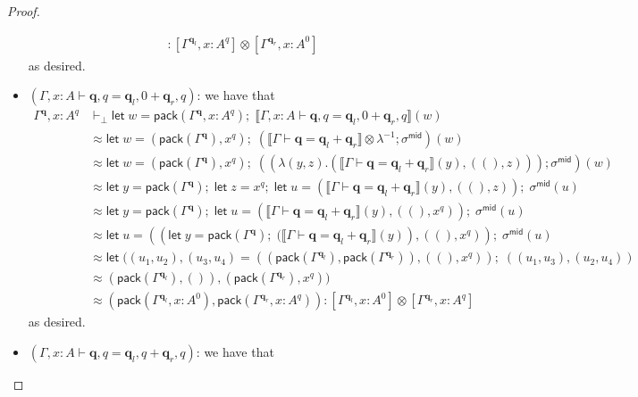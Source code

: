 \documentclass[acmsmall,screen,review]{acmart}
\newcommand{\mb}[1]{\ensuremath{\mathbf{#1}}}
\newcommand{\ms}[1]{\ensuremath{\mathsf{#1}}}
\newcommand{\letexpr}[3]{\ensuremath{\ms{let}\;#1 = #2;\;#3}}
\newcommand{\qsp}[4]{#1 \vdash #2 = #3 + #4}
\newcommand{\dnt}[1]{\llbracket{#1}\rrbracket}
\begin{document}
\begin{proof}
\begin{itemize}
\begin{align*}
        : [\Gamma^{\mb{q}_l}, x : A^q] \otimes [\Gamma^{\mb{q}_r}, x : A^0]
    \end{align*}
    as desired.
    \item $(\qsp{\Gamma, x : A}{\mb{q}, q}{\mb{q}_l, 0}{\mb{q}_r, q})$: we have that
    \begin{align*}
      \Gamma^{\mb{q}}, x : A^q &\vdash_\bot
        \letexpr{w}{\ms{pack}(\Gamma^{\mb{q}}, x : A^q)}
          {\dnt{\qsp{\Gamma, x : A}{\mb{q}, q}{\mb{q}_l, 0}{\mb{q}_r, q}}(w)} \\
        &\approx
        \letexpr{w}{(\ms{pack}(\Gamma^{\mb{q}}), x^q)}{
          (\dnt{\qsp{\Gamma}{\mb{q}}{\mb{q}_l}{\mb{q}_r}} \otimes \lambda^{-1} 
            ; \sigma^{\ms{mid}})(w)
        } \\
        &\approx
        \letexpr{w}{(\ms{pack}(\Gamma^{\mb{q}}), x^q)}{
          ((\lambda (y, z) . (\dnt{\qsp{\Gamma}{\mb{q}}{\mb{q}_l}{\mb{q}_r}}(y), ((), z))) 
            ; \sigma^{\ms{mid}})(w)
        } \\
        &\approx
        \letexpr{y}{\ms{pack}(\Gamma^{\mb{q}})}{
          \letexpr{z}{x^q}{
            \letexpr{u}{(\dnt{\qsp{\Gamma}{\mb{q}}{\mb{q}_l}{\mb{q}_r}}(y), ((), z))}
              {\sigma^{\ms{mid}}(u)}
          }
        }
        \\
        &\approx
        \letexpr{y}{\ms{pack}(\Gamma^{\mb{q}})}{
          \letexpr{u}{(\dnt{\qsp{\Gamma}{\mb{q}}{\mb{q}_l}{\mb{q}_r}}(y), ((), x^q))}
            {\sigma^{\ms{mid}}(u)}
        }
        \\
        &\approx
        \letexpr{u}{
          ((\letexpr{y}{\ms{pack}(\Gamma^{\mb{q}})}
            {(\dnt{\qsp{\Gamma}{\mb{q}}{\mb{q}_l}{\mb{q}_r}}(y)}), ((), x^q))
          }
          {\sigma^{\ms{mid}}(u)}
        \\
        &\approx
        \letexpr{((u_1, u_2), (u_3, u_4)}{
          ((\ms{pack}(\Gamma^{\mb{q}_l}), \ms{pack}(\Gamma^{\mb{q}_r})), ((), x^q))
          }
          {((u_1, u_3), (u_2, u_4))}
        \\
        &\approx
          (\ms{pack}(\Gamma^{\mb{q}_l}), ()), (\ms{pack}(\Gamma^{\mb{q}_r}), x^q))
        \\
        &\approx
          (\ms{pack}(\Gamma^{\mb{q}_l}, x : A^0), \ms{pack}(\Gamma^{\mb{q}_r}, x : A^q))
        : [\Gamma^{\mb{q}_l}, x : A^0] \otimes [\Gamma^{\mb{q}_r}, x : A^q]
    \end{align*}
    as desired.
    \item $(\qsp{\Gamma, x : A}{\mb{q}, q}{\mb{q}_l, q}{\mb{q}_r, q})$: we have that

\end{itemize}
\end{proof}
\end{document}
